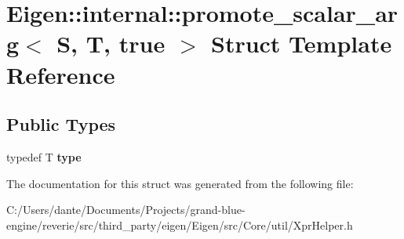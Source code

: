 \hypertarget{struct_eigen_1_1internal_1_1promote__scalar__arg_3_01_s_00_01_t_00_01true_01_4}{}\section{Eigen\+::internal\+::promote\+\_\+scalar\+\_\+arg$<$ S, T, true $>$ Struct Template Reference}
\label{struct_eigen_1_1internal_1_1promote__scalar__arg_3_01_s_00_01_t_00_01true_01_4}
\subsection*{Public Types}
\begin{DoxyCompactItemize}
\item 
\mbox{\label{struct_eigen_1_1internal_1_1promote__scalar__arg_3_01_s_00_01_t_00_01true_01_4_ad735bb85aee92d74e50b13817d834cdb}} 
typedef T {\bfseries type}
\end{DoxyCompactItemize}


The documentation for this struct was generated from the following file\+:\begin{DoxyCompactItemize}
\item 
C\+:/\+Users/dante/\+Documents/\+Projects/grand-\/blue-\/engine/reverie/src/third\+\_\+party/eigen/\+Eigen/src/\+Core/util/Xpr\+Helper.\+h\end{DoxyCompactItemize}
